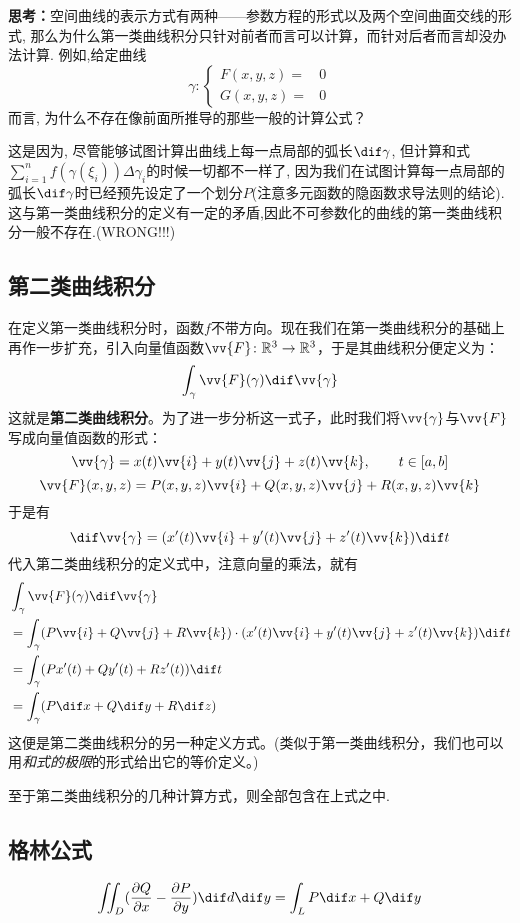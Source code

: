 	\textbf{思考：}空间曲线的表示方式有两种——参数方程的形式以及两个空间曲面交线的形式, 那么为什么第一类曲线积分只针对前者而言可以计算，而针对后者而言却没办法计算. 例如,给定曲线
	\begin{equation*}
		\gamma: \left\{ \begin{aligned}
				F(x,y,z) =& 0 \\
				G(x,y,z) =& 0
			\end{aligned} \right.
	\end{equation*}
	而言, 为什么不存在像前面所推导的那些一般的计算公式？\par
	这是因为, 尽管能够试图计算出曲线上每一点局部的弧长$\dif\gamma$, 但计算和式$\sum_{i=1}^n f(\gamma(\xi_i)) \Delta \gamma_i$的时候一切都不一样了, 因为我们在试图计算每一点局部的弧长$\dif\gamma$时已经预先设定了一个划分$P$(注意多元函数的隐函数求导法则的结论). 这与第一类曲线积分的定义有一定的矛盾,因此不可参数化的曲线的第一类曲线积分一般不存在.(WRONG!!!)

	\subsection{第二类曲线积分}
	在定义第一类曲线积分时，函数$f$不带方向。现在我们在第一类曲线积分的基础上再作一步扩充，引入向量值函数$\vv{F}\colon\mathbb{R}^3\rightarrow \mathbb{R}^3$，于是其曲线积分便定义为：
		$$\int_\gamma \vv{F}(\gamma) \dif \vv{\gamma}$$
	这就是\textbf{第二类曲线积分}。为了进一步分析这一式子，此时我们将$\vv{\gamma}$与$\vv{F}$写成向量值函数的形式：
			$$\vv{\gamma} = x(t)\vv{i}+y(t)\vv{j}+z(t)\vv{k},\qquad t\in[a,b]$$
			$$\vv{F}(x,y,z) = P(x,y,z)\vv{i}+Q(x,y,z)\vv{j}+R(x,y,z)\vv{k}$$
	于是有
		$$\dif \vv{\gamma} = (x'(t)\vv{i}+y'(t)\vv{j}+z'(t)\vv{k})\dif t$$
	代入第二类曲线积分的定义式中，注意向量的乘法，就有
		\begin{equation}
			\begin{aligned}
				& \int_\gamma \vv{F}(\gamma) \dif \vv{\gamma} \\
				&= \int_\gamma (P\vv{i}+Q\vv{j}+R\vv{k})\cdot (x'(t)\vv{i}+y'(t)\vv{j}+z'(t)\vv{k})\dif t \\
				&= \int_\gamma (Px'(t)+Qy'(t)+Rz'(t)) \dif t \\
				&= \int_\gamma (P\dif x + Q\dif y + R\dif z)
			\end{aligned}
		\end{equation}
	这便是第二类曲线积分的另一种定义方式。(类似于第一类曲线积分，我们也可以用\emph{和式的极限}的形式给出它的等价定义。)\par
	至于第二类曲线积分的几种计算方式，则全部包含在上式之中.

	\subsection{格林公式}

	$$ \iint_D (\frac{\partial Q}{\partial x} -\frac{\partial P}{\partial y}) \dif d\dif y = \int_L P\dif x+Q \dif y$$
